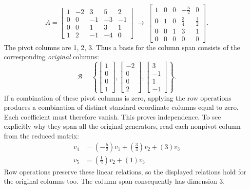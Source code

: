\[A=\left[\begin{array}{rrrrr}1&-2&3&5&2\\0&0&-1&-3&-1\\0&0&1&3&1\\1&2&-1&-4&0\end{array}\right]\ \longrightarrow\ \left[\begin{array}{rrrrr}1&0&0&- \frac{5}{2}&0\\0&1&0&\frac{3}{4}&\frac{1}{2}\\0&0&1&3&1\\0&0&0&0&0\end{array}\right].\]
The pivot columns are 1, 2, 3. Thus a basis for the column span consists of the corresponding \emph{original} columns:
\[\mathcal B=\left\{\left[\begin{array}{r}1\\0\\0\\1\end{array}\right],\left[\begin{array}{r}-2\\0\\0\\2\end{array}\right],\left[\begin{array}{r}3\\-1\\1\\-1\end{array}\right]\right\}.\]
If a combination of these pivot columns is zero, applying the row operations produces a combination of distinct standard coordinate columns equal to zero. Each coefficient must therefore vanish. This proves independence. To see explicitly why they span all the original generators, read each nonpivot column from the reduced matrix:
\[\begin{aligned}v_{4}&=(- \frac{5}{2})v_{1}+(\frac{3}{4})v_{2}+(3)v_{3}\\v_{5}&=(\frac{1}{2})v_{2}+(1)v_{3}\end{aligned}\]
Row operations preserve these linear relations, so the displayed relations hold for the original columns too. The column span consequently has dimension $3$.


